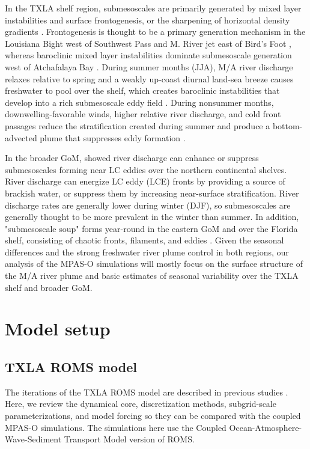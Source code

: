 In the TXLA shelf region, submesoscales are primarily generated by mixed layer instabilities and surface frontogenesis, or the sharpening of horizontal density gradients \citep{hoskins1982mathematical, mcwilliams2021oceanic}. Frontogenesis is thought to be a primary generation mechanism in the Louisiana Bight west of Southwest Pass and M. River jet east of Bird's Foot \citep{Barkan_2017, wang2021structure}, whereas baroclinic mixed layer instabilities dominate submesoscale generation west of Atchafalaya Bay \citep{Hetland_2017, Schlichting23}. During summer months (JJA), M/A river discharge relaxes relative to spring and a weakly up-coast diurnal land-sea breeze causes freshwater to pool over the shelf, which creates baroclinic instabilities that develop into a rich submesoscale eddy field \citep{Hetland_2017, Kobashi_2020, Schlichting23}. During nonsummer months, downwelling-favorable winds, higher relative river discharge, and cold front passages reduce the stratification created during summer and produce a bottom-advected plume that suppresses eddy formation \citep{hetland2012integrated, zhang2014wind}.

In the broader GoM, \citet{barkan2017submesoscalepart2} showed river discharge can enhance or suppress submesoscales forming near LC eddies over the northern continental shelves. River discharge can energize LC eddy (LCE) fronts by providing a source of brackish water, or suppress them by increasing near-surface stratification. River discharge rates are generally lower during winter (DJF), so submesoscales are generally thought to be more prevalent in the winter than summer. In addition, "submesoscale soup" forms year-round in the eastern GoM and over the Florida shelf, consisting of chaotic fronts, filaments, and eddies \citep{Barkan_2017, liu2021submesoscale}. Given the seasonal differences and the strong freshwater river plume control in both regions, our analysis of the MPAS-O simulations will mostly focus on the surface structure of the M/A river plume and basic estimates of seasonal variability over the TXLA shelf and broader GoM. 

\section{Model setup} \label{sec:coupled_setup}
\subsection{TXLA ROMS model}
The iterations of the TXLA ROMS model are described in previous studies \citep{Kobashi_2020, qu2022rapid, Schlichting23}. Here, we review the dynamical core, discretization methods, subgrid-scale parameterizations, and model forcing so they can be compared with the coupled MPAS-O simulations. The simulations here use the Coupled Ocean-Atmosphere-Wave-Sediment Transport Model \citep{Warner_2010} version of ROMS.

